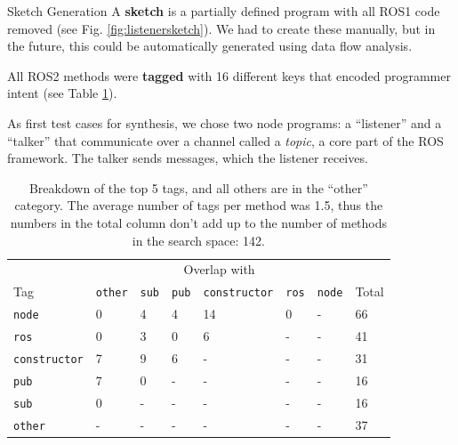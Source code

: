 \documentclass[final]{beamer}
\newlength{\onecolwid}
\newlength{\twocolwid}
\begin{document}
\begin{frame}[t]
\begin{columns}[t]
\begin{column}{\twocolwid}
\begin{columns}[t,totalwidth=\twocolwid]
\begin{column}{\onecolwid}
\begin{block}{Sketch Generation}
A \textbf{sketch} is a partially defined program with all ROS1 code removed (see Fig. \ref{fig:listenersketch}). We had to create these manually, but in the future, this could be automatically generated using data flow analysis. %

All ROS2 methods were \textbf{tagged} with 16 different keys that encoded programmer intent (see Table \ref{tab:tags}).

As first test cases for synthesis, we chose two node programs: a ``listener'' and a ``talker'' that communicate over a channel called a \textit{topic}, a core part of the ROS framework. The talker sends messages, which the listener receives.
\end{block}


\begin{table}[h]
	\footnotesize
	\begin{tabular}{llllllll}
						&\multicolumn{6}{c}{Overlap with}	\\
		Tag				&\texttt{other}	&\texttt{sub}	&\texttt{pub}	&\texttt{constructor}	&\texttt{ros}	&\texttt{node}	&	Total	\\
		\texttt{node}	&0				&4				&4				&14						&0						&-				&66	\\
		\texttt{ros}	&0				&3				&0				&6						&-						&-				&41	\\
	\texttt{constructor}&7				&9				&6				&-						&-						&-				&31	\\
		\texttt{pub}	&7				&0				&-				&-						&-						&-				&16	\\
		\texttt{sub}	&0				&-				&-				&-						&-						&-				&16	\\
		\texttt{other}	&-				&-				&-				&-						&-						&-				&37
	\end{tabular}
	\caption{Breakdown of the top 5 tags, and all others are in the ``other'' category. The average number of tags per method was 1.5, thus the numbers in the total column don't add up to the number of methods in the search space: 142.}
	\label{tab:tags}
\end{table}





\end{column}
\end{columns}
\end{column}
\end{columns}
\end{frame}
\end{document}

